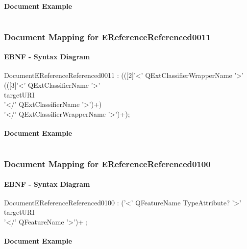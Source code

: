 \documentclass[11pt,a4paper]{article}
\begin{document}
\paragraph{Document Example}
\inputminted[fontsize=\footnotesize]{xml}{examples/EReferenceReferenced0010.xml}


\subsubsection{Document Mapping for EReferenceReferenced0011}
\paragraph{EBNF - Syntax Diagram}
\begin{rail}
DocumentEReferenceReferenced0011 : (([2]'<' QExtClassifierWrapperName '>'\\
(([3]'<' QExtClassifierName  '>' \\ 
targetURI \\ 
'</' QExtClassifierName  '>')+) \\
'</' QExtClassifierWrapperName '>')+);
\end{rail}
\paragraph{Document Example}
\inputminted[fontsize=\footnotesize]{xml}{examples/EReferenceReferenced0011.xml}



\subsubsection{Document Mapping for EReferenceReferenced0100}
\paragraph{EBNF - Syntax Diagram}
\begin{rail}
DocumentEReferenceReferenced0100 : ('<' QFeatureName TypeAttribute? '>' \\
targetURI \\ 
'</' QFeatureName '>')+ ;
\end{rail}
\paragraph{Document Example}
\inputminted[fontsize=\footnotesize]{xml}{examples/EReferenceReferenced0100.xml}
\end{document}
